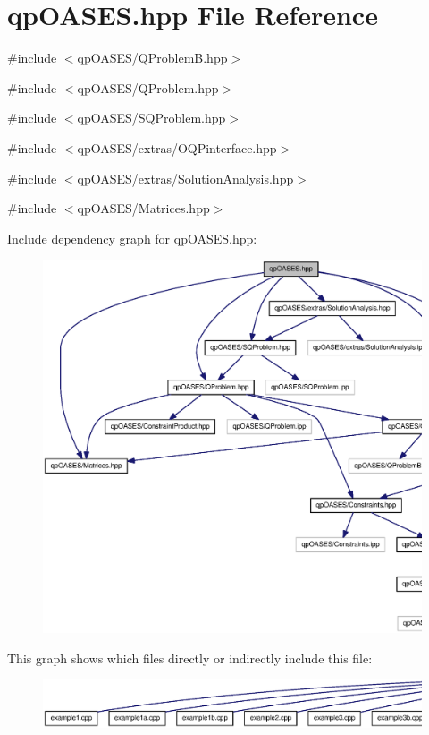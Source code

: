 \section{qpOASES.hpp File Reference}
\label{qpOASES_8hpp}
{\ttfamily \#include $<$qpOASES/QProblemB.hpp$>$}\par
{\ttfamily \#include $<$qpOASES/QProblem.hpp$>$}\par
{\ttfamily \#include $<$qpOASES/SQProblem.hpp$>$}\par
{\ttfamily \#include $<$qpOASES/extras/OQPinterface.hpp$>$}\par
{\ttfamily \#include $<$qpOASES/extras/SolutionAnalysis.hpp$>$}\par
{\ttfamily \#include $<$qpOASES/Matrices.hpp$>$}\par
Include dependency graph for qpOASES.hpp:
\nopagebreak
\begin{figure}[H]
\begin{center}
\leavevmode
\includegraphics[width=400pt]{qpOASES_8hpp__incl}
\end{center}
\end{figure}
This graph shows which files directly or indirectly include this file:
\nopagebreak
\begin{figure}[H]
\begin{center}
\leavevmode
\includegraphics[width=400pt]{qpOASES_8hpp__dep__incl}
\end{center}
\end{figure}


